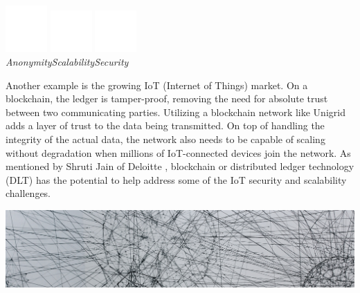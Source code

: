 \documentclass[a4paper,oneside]{article}
\begin{document}
\begin{center}
\includegraphics[width=45pt]{anonymous}
\hspace{1.5cm}
\includegraphics[width=45pt]{scalability}
\hspace{1.5cm}
\includegraphics[width=45pt]{security}
\\
\vspace{0.11cm}
\hspace{0pt}\emph{Anonymity}\hspace{49pt}\emph{Scalability}\hspace{58pt}\emph{Security}\hspace{25pt}
\end{center}

\noindent Another example is the growing IoT (Internet of Things) market. On a blockchain, the ledger is tamper-proof, removing the need for absolute trust between two communicating parties. Utilizing a blockchain network like Unigrid adds a layer of trust to the data being transmitted. On top of handling the integrity of the actual data, the network also needs to be capable of scaling without degradation when millions of IoT-connected devices join the network. As mentioned by Shruti Jain of Deloitte \cite{jain2021}, blockchain or distributed ledger technology (DLT) has the potential to help address some of the IoT security and scalability challenges.

\begin{mdframed}[style=textimage]
	\includegraphics[width=381pt]{communication}
\end{mdframed}
\end{document}

